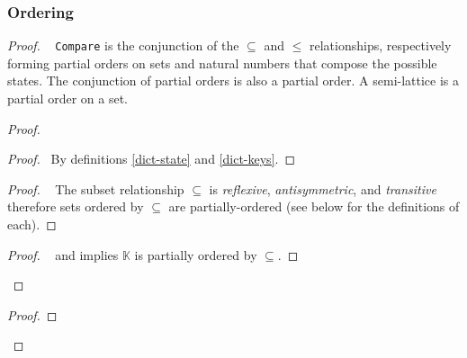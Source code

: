 \documentclass[10pt, oneside]{article}   	%
\begin{document}
\subsubsection{Ordering}
\label{sec:longer-proofs:ordering}

\begin{proof}
		\pfsketch~ \texttt{Compare} is the conjunction of the $\subseteq$ and $\leq$ relationships, respectively forming partial orders on sets and natural numbers that compose the possible states. The conjunction of partial orders is also a partial order. A semi-lattice is a partial order on a set.
		\begin{proof}
		
			\begin{proof}
				\pf~By definitions \ref{dict-state} and \ref{dict-keys}.
			\end{proof}
			
			\begin{proof}
				\pf~ The subset relationship $\subseteq$ is \textit{reflexive}, \textit{antisymmetric}, and \textit{transitive} therefore sets ordered by $\subseteq$ are partially-ordered (see below for the definitions of each).
			\end{proof}
			
			\qedstep
			 \begin{proof}
			  	\pf~ and  implies $\mathds{K}$ is partially ordered by $\subseteq$.
			\end{proof}
		\end{proof}
		
		\begin{proof}
		

\end{proof}
\end{proof}
\end{document}

